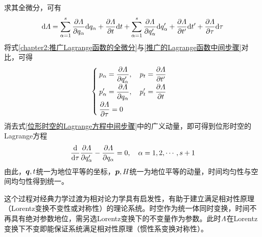 求其全微分，可有
\begin{equation}
	\mathrm{d} \mathnormal{\Lambda} = \sum_{\alpha=1}^s \frac{\partial \mathnormal{\Lambda}}{\partial q_\alpha} \mathrm{d} q_\alpha + \frac{\partial \mathnormal{\Lambda}}{\partial t} \mathrm{d} t + \sum_{\alpha=1}^s \frac{\partial \mathnormal{\Lambda}}{\partial q'_\alpha} \mathrm{d} q'_\alpha + \frac{\partial \mathnormal{\Lambda}}{\partial t'} \mathrm{d} t' + \frac{\partial \mathnormal{\Lambda}}{\partial \tau} \mathrm{d} \tau
	\label{chapter2:推广Lagrange函数的全微分}
\end{equation}
将式\eqref{chapter2:推广Lagrange函数的全微分}与\eqref{推广的Lagrange函数中间步骤}对比，可得
\begin{equation}
	\begin{cases}
		\displaystyle p_\alpha = \frac{\partial \mathnormal{\Lambda}}{\partial q'_\alpha},\quad p_t = \frac{\partial \mathnormal{\Lambda}}{\partial t'} \\[1.5ex]
		\displaystyle p'_\alpha = \frac{\partial \mathnormal{\Lambda}}{\partial q_\alpha},\quad p'_t = \frac{\partial \mathnormal{\Lambda}}{\partial t} \\[1.5ex]
		\displaystyle \frac{\partial \mathnormal{\Lambda}}{\partial \tau} = 0
	\end{cases}
	\label{位形时空的Lagrange方程中间步骤}
\end{equation}
消去式\eqref{位形时空的Lagrange方程中间步骤}中的广义动量，即可得到{\heiti 位形时空的Lagrange方程}
\begin{equation}
	\frac{\mathrm{d}}{\mathrm{d} \tau} \frac{\partial \mathnormal{\Lambda}}{\partial q'_\alpha} - \frac{\partial \mathnormal{\Lambda}}{\partial q_\alpha} = 0,\quad \alpha = 1,2,\cdots,s+1
	\label{位形时空的Lagrange方程}
\end{equation}
由此，$\boldsymbol{q},t$统一为地位平等的坐标，$\boldsymbol{p},H$统一为地位平等的动量，时间均匀性与空间均匀性得到统一。

这个过程对经典力学过渡为相对论力学具有启发性，有助于建立满足相对性原理（Lorentz变换不变性或对称性）的理论系统。时空作为统一体同时变换，时间不再具有绝对参数地位，需另选Lorentz变换下的不变量作为参数。此时$\mathnormal{\Lambda}$在Lorentz变换下不变即能保证系统满足相对性原理（惯性系变换对称性）。

